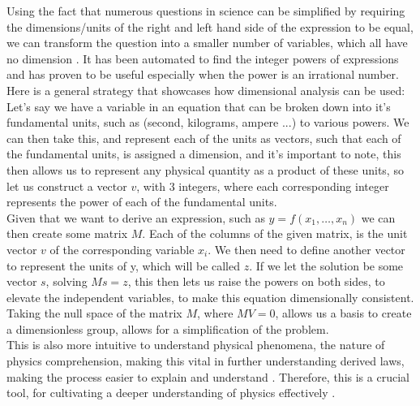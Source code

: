 \documentclass{article}
\begin{document}
Using the fact that numerous questions in science can be simplified by requiring the dimensions/units
of the right and left hand side of the expression to be equal, we can transform the question into
a smaller number of variables, which all have no dimension \cite{Blasiak2012}. It has been automated to find the integer powers of expressions and has proven to be useful especially when the power is an irrational number.\\

Here is a general strategy that showcases how dimensional analysis can be used:\\

Let's say we have a variable in an equation that can be broken down into it's fundamental units, such as (second, kilograms, ampere ...) to various powers. We can then take this, and represent each of the units as vectors, such that each of the fundamental units, is assigned a dimension, and it's important to note, this then allows us to represent any physical quantity as a product of these units, so let us construct a vector $v$, with $3$ integers, where each corresponding integer represents the power of each of the fundamental units.\\ 

Given that we want to derive an expression, such as $y = f(x_1, \dots, x_n)$  we can then create some matrix $M$. Each of the columns of the given matrix, is the unit vector $v$ of the corresponding variable $x_i$. We then need to define another vector to represent the units of y, which will be called $z$. If we let the solution be some vector $s$, solving $Ms = z$, this then lets us raise the powers on both sides, to elevate the independent variables, to make this equation dimensionally consistent.\\ 

Taking the null space of the matrix $M$, where $MV = 0$, allows us a basis to create a dimensionless group, allows for a simplification of the problem.\\

This is also more intuitive to understand physical phenomena, the nature of physics comprehension, making this vital in further understanding derived laws, making the process easier to explain and understand \cite{Taber2009}. Therefore, this is a crucial tool, for cultivating a deeper understanding of physics effectively \cite{Tenachi2023}. \\
\end{document}
